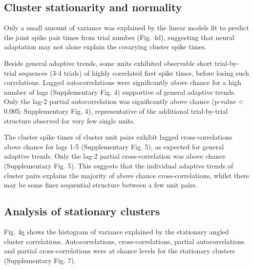 \documentclass{article}
\begin{document}
\subsection*{Cluster stationarity and normality}

Only a small amount of variance was explained by the linear models fit to predict the joint spike pair times from trial number (Fig. 4d), suggesting that neural adaptation may not alone explain the covarying cluster spike times. 

Beside general adaptive trends, some units exhibited observable short trial-by-trial sequences (3-4 trials) of highly correlated first spike times, before losing such correlations. Lagged autocorrelations were significantly above chance for a high number of lags (Supplementary Fig. 4) supportive of general adaptive trends. Only the lag-2 partial autocorrelation was significantly above chance (p-value < 0.005; Supplementary Fig. 4), representative of the additional trial-by-trial structure observed for very few single units.

The cluster spike times of cluster unit pairs exhibit lagged cross-correlations above chance for lags 1-5 (Supplementary Fig. 5), as expected for general adaptive trends. Only the lag-2 partial cross-correlation was above chance (Supplementary Fig. 5). This suggests that the individual adaptive trends of cluster pairs explains the majority of above chance cross-correlations, whilst there may be some finer sequential structure between a few unit pairs. 





\subsection*{Analysis of stationary clusters}
Fig. 4g shows the histogram of variance explained by the stationary angled cluster correlations. Autocorrelations, cross-correlations, partial autocorrelations and partial cross-correlations were at chance levels for the stationary clusters (Supplementary Fig. 7).
\end{document}

